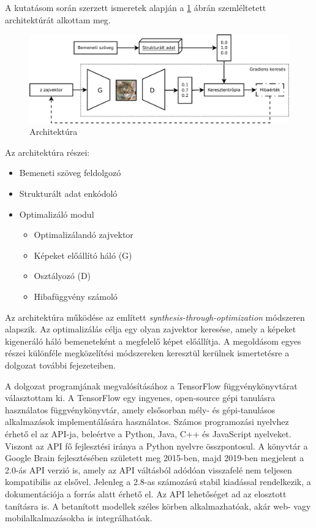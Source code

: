 
A kutatásom során szerzett ismeretek alapján a \ref{fig:architecture} ábrán szemléltetett architektúrát alkottam meg.

\begin{figure}[h]
\centering
\includegraphics[width=15cm]{images/architecture.png}
\caption{Architektúra}
\label{fig:architecture}
\end{figure}

Az architektúra részei:

\begin{itemize}
	\item Bemeneti szöveg feldolgozó
	\item Strukturált adat enkódoló
	\item Optimalizáló modul
		\begin{itemize}
			\item Optimalizálandó zajvektor
			\item Képeket előállító háló (G)
			\item Osztályozó (D)
			\item Hibafüggvény számoló
		\end{itemize}
\end{itemize}

Az architektúra működése az említett \textit{synthesis-through-optimization} módszeren alapszik. Az optimalizálás célja egy olyan zajvektor keresése, amely a képeket kigeneráló háló bemeneteként a megfelelő képet előállítja.
A megoldásom egyes részei különféle megközelítési módszereken keresztül kerülnek ismertetésre a dolgozat további fejezeteiben.



A dolgozat programjának megvalósításához a TensorFlow függvénykönyvtárat választottam ki. A TensorFlow egy ingyenes, open-source gépi tanulásra használatos függvénykönyvtár, amely elsősorban mély- és gépi-tanulásos alkalmazások implementálására használatos. Számos programozási nyelvhez érhető el az API-ja, beleértve a Python, Java, C++ és JavaScript nyelveket. Viszont az API fő fejlesztési iránya a Python nyelvre összpontosul. A könyvtár a Google Brain fejlesztésében született meg 2015-ben, majd 2019-ben megjelent a 2.0-ás API verzió is, amely az API váltásból adódóan visszafelé nem teljesen kompatibilis az elsővel. Jelenleg a 2.8-as számozású stabil kiadással rendelkezik, a dokumentációja a \cite{tensorflow} forrás alatt érhető el. Az API lehetőséget ad az elosztott tanításra is. A betanított modellek széles körben alkalmazhatóak, akár web- vagy mobilalkalmazásokba is integrálhatóak. 

